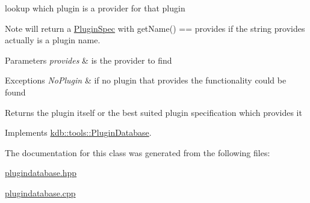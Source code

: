 lookup which plugin is a provider for that plugin 

\begin{DoxyNote}{Note}
will return a \hyperlink{classkdb_1_1tools_1_1PluginSpec}{Plugin\+Spec} with get\+Name() == provides if the string provides actually is a plugin name.
\end{DoxyNote}

\begin{DoxyParams}{Parameters}
{\em provides} & is the provider to find\\
\hline
\end{DoxyParams}

\begin{DoxyExceptions}{Exceptions}
{\em No\+Plugin} & if no plugin that provides the functionality could be found\\
\hline
\end{DoxyExceptions}
\begin{DoxyReturn}{Returns}
the plugin itself or the best suited plugin specification which provides it 
\end{DoxyReturn}


Implements \hyperlink{classkdb_1_1tools_1_1PluginDatabase_a43abe56a024218ecee48526ced699f05}{kdb\+::tools\+::\+Plugin\+Database}.



The documentation for this class was generated from the following files\+:\begin{DoxyCompactItemize}
\item 
\hyperlink{plugindatabase_8hpp}{plugindatabase.\+hpp}\item 
\hyperlink{plugindatabase_8cpp}{plugindatabase.\+cpp}\end{DoxyCompactItemize}
